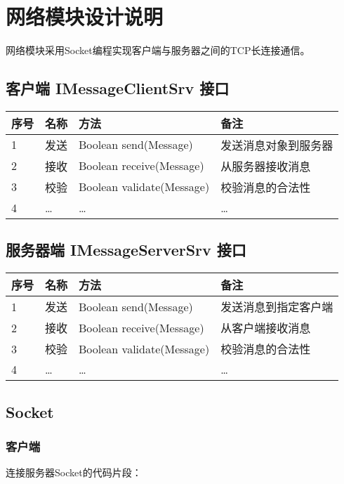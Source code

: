 \documentclass[a4paper]{ctexart}
\begin{document}
\section{网络模块设计说明}
网络模块采用Socket编程实现客户端与服务器之间的TCP长连接通信。

\subsection{客户端 IMessageClientSrv 接口}
\begin{tabular}{llll}
    \toprule
    \textbf{序号} & \textbf{名称} & \textbf{方法}               & \textbf{备注} \\
    \midrule
    1           & 发送          & Boolean send(Message)     & 发送消息对象到服务器  \\
    2           & 接收          & Boolean receive(Message)  & 从服务器接收消息    \\
    3           & 校验          & Boolean validate(Message) & 校验消息的合法性    \\
    4           & …           & …                         & …           \\
    \bottomrule
\end{tabular}

\subsection{服务器端 IMessageServerSrv 接口}
\begin{tabular}{llll}
    \toprule
    \textbf{序号} & \textbf{名称} & \textbf{方法}               & \textbf{备注} \\
    \midrule
    1           & 发送          & Boolean send(Message)     & 发送消息到指定客户端  \\
    2           & 接收          & Boolean receive(Message)  & 从客户端接收消息    \\
    3           & 校验          & Boolean validate(Message) & 校验消息的合法性    \\
    4           & …           & …                         & …           \\
    \bottomrule
\end{tabular}

\subsection{Socket}
\subsubsection{客户端}
连接服务器Socket的代码片段：
\begin{comment}
\begin{lstlisting}
// 连接服务器Socket
clientSocket = new Socket(SERVER_ADDRESS, SERVER_PORT);
\end{lstlisting}
\end{comment}
\end{document}
